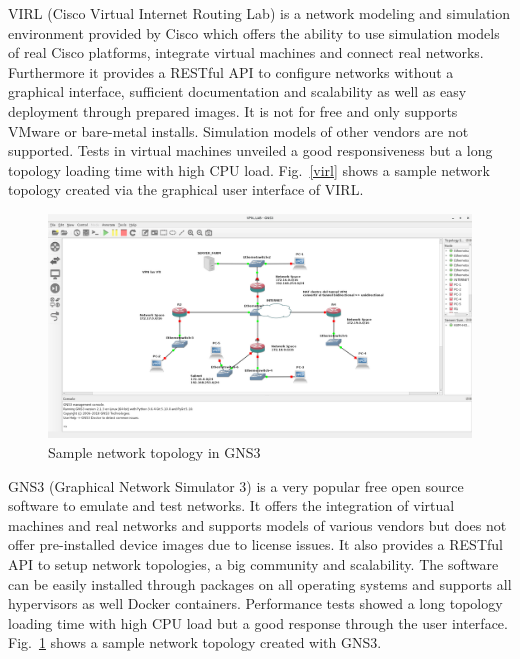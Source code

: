 \documentclass[conference]{IEEEtran}
\begin{document}
VIRL (Cisco Virtual Internet Routing Lab) is a network modeling and simulation environment provided by Cisco which offers the ability to use simulation models of real Cisco platforms, integrate virtual machines and connect real networks. Furthermore it provides a RESTful API to configure networks without a graphical interface, sufficient documentation and scalability as well as easy deployment through prepared images. It is not for free and only supports VMware or bare-metal installs. Simulation models of other vendors are not supported. Tests in virtual machines unveiled a good responsiveness but a long topology loading time with high CPU load. Fig.~\ref{virl} shows a sample network topology created via the graphical user interface of VIRL.  \cite{b1} \cite{b3}

\newpage

\begin{figure}[htbp]
\centerline{\includegraphics[scale=0.13]{gns3.png}}
\caption{Sample network topology in GNS3 \cite{b4}}
\label{gns3}
\end{figure}

GNS3 (Graphical Network Simulator 3) is a very popular free open source software to emulate and test networks. It offers the integration of virtual machines and real networks and supports models of various vendors but does not offer pre-installed device images due to license issues. It also provides a RESTful API to setup network topologies, a big community and scalability. The software can be easily installed through packages on all operating systems and supports all hypervisors as well Docker containers. Performance tests showed a long topology loading time with high CPU load but a good response through the user interface. Fig.~\ref{gns3} shows a sample network topology created with GNS3.  \cite{b1} \cite{b5}
\end{document}
